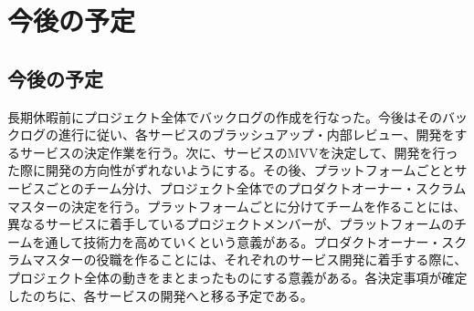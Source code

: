 \chapter{今後の予定}
\section{今後の予定}

長期休暇前にプロジェクト全体でバックログの作成を行なった。今後はそのバックログの進行に従い、各サービスのブラッシュアップ・内部レビュー、開発をするサービスの決定作業を行う。次に、サービスのMVVを決定して、開発を行った際に開発の方向性がずれないようにする。その後、プラットフォームごととサービスごとのチーム分け、プロジェクト全体でのプロダクトオーナー・スクラムマスターの決定を行う。プラットフォームごとに分けてチームを作ることには、異なるサービスに着手しているプロジェクトメンバーが、プラットフォームのチームを通して技術力を高めていくという意義がある。プロダクトオーナー・スクラムマスターの役職を作ることには、それぞれのサービス開発に着手する際に、プロジェクト全体の動きをまとまったものにする意義がある。各決定事項が確定したのちに、各サービスの開発へと移る予定である。


